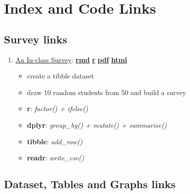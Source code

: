 \documentclass[
]{book}
\providecommand{\tightlist}{%
  \setlength{\itemsep}{0pt}\setlength{\parskip}{0pt}}
\begin{document}
\hypertarget{appendix-appendix}{%
\appendix}


\hypertarget{index-and-code-links}{%
\chapter{Index and Code Links}\label{index-and-code-links}}

\hypertarget{survey-links}{%
\section{Survey links}\label{survey-links}}

\begin{enumerate}
\def\labelenumi{\arabic{enumi}.}
\tightlist
\item
  \href{https://fanwangecon.github.io/Stat4Econ/survey/htmlpdfr/classsurvey.html}{An In-class Survey}: \href{https://github.com/FanWangEcon/Stat4Econ/blob/master/survey//classsurvey.Rmd}{\textbf{rmd}} \textbar{} \href{https://github.com/FanWangEcon/Stat4Econ/blob/master/survey/htmlpdfr/classsurvey.R}{\textbf{r}} \textbar{} \href{https://github.com/FanWangEcon/Stat4Econ/blob/master/survey/htmlpdfr/classsurvey.pdf}{\textbf{pdf}} \textbar{} \href{https://fanwangecon.github.io/Stat4Econ/survey/htmlpdfr/classsurvey.html}{\textbf{html}}

  \begin{itemize}
  \tightlist
  \item
    create a tibble dataset
  \item
    draw 10 random students from 50 and build a survey
  \item
    \textbf{r}: \emph{factor() + ifelse()}
  \item
    \textbf{dplyr}: \emph{group\_by() + mutate() + summarise()}
  \item
    \textbf{tibble}: \emph{add\_row()}
  \item
    \textbf{readr}: \emph{write\_csv()}
  \end{itemize}
\end{enumerate}

\hypertarget{dataset-tables-and-graphs-links}{%
\section{Dataset, Tables and Graphs links}\label{dataset-tables-and-graphs-links}}
\end{document}
